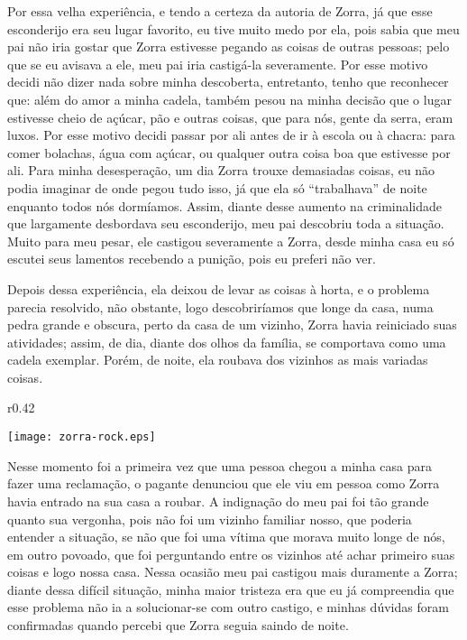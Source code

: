 Por essa velha experiência, e tendo a certeza da autoria de Zorra, já que esse esconderijo era seu lugar favorito, eu tive muito medo por ela, pois sabia que meu pai não iria gostar que Zorra estivesse pegando as coisas de outras pessoas; pelo que se eu avisava a ele, meu pai iria castigá-la severamente. Por esse motivo decidi não dizer nada sobre minha descoberta, entretanto, tenho que reconhecer que: além do amor a minha cadela, também pesou na minha decisão que o lugar estivesse cheio de açúcar, pão e outras coisas, que para nós, gente da serra, eram luxos. 
Por esse motivo decidi passar por ali antes de ir à escola ou à chacra: para comer bolachas, água com açúcar, ou qualquer outra coisa boa que estivesse por ali. 
Para minha desesperação, um dia Zorra trouxe demasiadas coisas, eu  não podia imaginar de onde pegou tudo isso, já que ela só ``trabalhava'' de noite enquanto todos nós dormíamos. Assim, diante desse aumento na criminalidade que largamente desbordava seu esconderijo, meu pai descobriu toda a situação.
Muito para meu pesar, ele castigou severamente a Zorra, desde minha casa eu só escutei seus lamentos recebendo a punição, pois eu preferi não ver.


Depois dessa experiência, ela deixou de levar as coisas à horta, e o problema parecia resolvido, não obstante, logo descobriríamos que longe da casa, numa pedra grande e obscura, perto da casa de um vizinho, 
Zorra havia reiniciado suas atividades; assim, de dia, diante dos olhos da família, se comportava como uma cadela exemplar. Porém, de noite, ela roubava dos vizinhos as mais variadas coisas.

\ifdefined\EnableIncludeImages
\begin{wrapfigure}{r}{0.42\textwidth}
  \begin{center}
  \vspace{-10pt}
    \texttt{[image: zorra-rock.eps]}
  \end{center}
  \vspace{-20pt}
\end{wrapfigure}
\fi
Nesse momento foi a primeira vez que uma pessoa chegou a minha casa para fazer uma reclamação, o pagante denunciou que ele viu em pessoa como Zorra havia entrado na sua casa a roubar. 
A indignação do meu pai foi tão grande quanto sua vergonha, pois não foi um vizinho familiar nosso, que poderia entender a situação, se não que foi uma vítima que morava muito longe de nós, em outro povoado, que foi perguntando entre os vizinhos até achar primeiro suas coisas e logo nossa casa.
Nessa ocasião meu pai castigou mais duramente a Zorra; diante dessa difícil situação, minha maior tristeza era que eu já compreendia que esse problema não ia a solucionar-se com outro castigo, e minhas dúvidas foram confirmadas quando percebi que Zorra seguia saindo de noite. 

